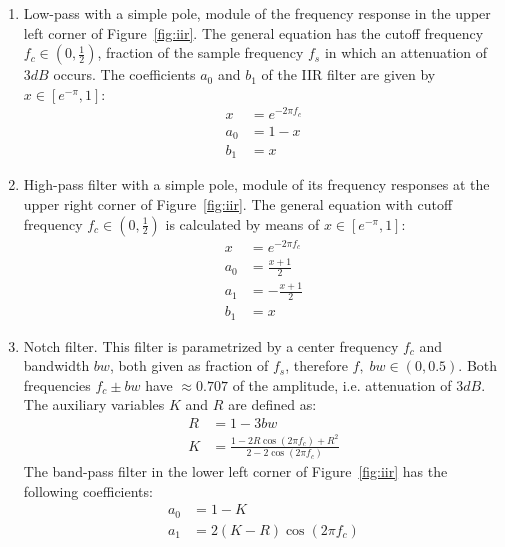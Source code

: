 \begin{enumerate}
  \item Low-pass with a simple pole, module of the frequency response in the upper left corner of Figure~\ref{fig:iir}. The general equation has the cutoff frequency $f_c \in (0,\frac{1}{2})$, fraction of the sample frequency $f_s$ in which an attenuation of $3dB$ occurs. The coefficients $a_0$ and $b_1$ of the IIR filter are given by $x \in [e^{-\pi},1]$:
\begin{equation}\label{eq:passa-baixas}
 \begin{split}
 x & =e^{-2\pi f_c} \\
 a_0 & =  1-x \\
 b_1 & =  x
 \end{split}
\end{equation}
  \item High-pass filter with a simple pole, module of its frequency responses at the upper right corner of Figure~\ref{fig:iir}. The general equation with cutoff frequency $f_c \in (0,\frac{1}{2})$ is calculated by means of $x \in [e^{-\pi},1]$:
\begin{equation}\label{eq:passa-altas}
 \begin{split}
 x & =e^{-2\pi f_c} \\
 a_0 & =  \frac{x+1}{2} \\
 a_1 & =  -\frac{x+1}{2} \\
 b_1 & =  x
 \end{split}
\end{equation}
\item Notch filter. This filter is parametrized by a center frequency $f_c$ and bandwidth $bw$, both given as fraction of $f_s$, therefore $f,\; bw \in (0,0.5)$. Both frequencies $f_c \pm bw$ have $\approx 0.707$ of the amplitude, i.e. attenuation of $3dB$. The auxiliary variables $K$ and $R$ are defined as:
\begin{equation}\label{eq:varAux}
 \begin{split}
  R & = 1 - 3bw \\
  K & = \frac{1-2R\cos(2\pi f_c) + R^2}{2 - 2 \cos (2 \pi f_c)}
 \end{split}
\end{equation}
The band-pass filter in the lower left corner of Figure~\ref{fig:iir} has the following coefficients:
\begin{equation}\label{eq:passa-banda}
 \begin{split}
 a_0 & =  1 - K \\
 a_1 & =  2(K-R)\cos (2\pi f_c) \\

\end{split}
\end{equation}
\end{enumerate}

